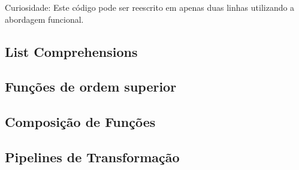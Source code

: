 \documentclass[date,twocolumn,a4paper]{ppgem}
\begin{document}
\pagebreak
Curiosidade: Este código pode ser reescrito em apenas duas linhas utilizando a abordagem funcional.


\subsection{List Comprehensions}
\subsection{Funções de ordem superior}
\subsection{Composição de Funções}
\subsection{Pipelines de Transformação}



\end{document}
